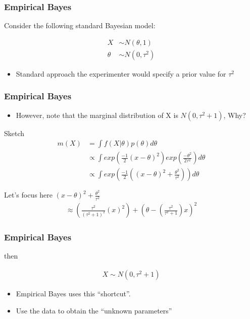 \documentclass[
  shownotes,
  xcolor={svgnames},
  hyperref={colorlinks,citecolor=DarkBlue,linkcolor=DarkRed,urlcolor=DarkBlue}
  , aspectratio=169]{beamer}
\begin{document}
\begin{frame}[fragile]
\frametitle{Empirical Bayes}

Consider the following standard Bayesian model:

\bigskip

\begin{align}
X &\sim N(\theta,1) \\
\theta &\sim N(0,\tau^2) 
\end{align}

\bigskip
\begin{itemize}
  \item Standard approach the experimenter would specify a prior value for $\tau^2$
\end{itemize}


\end{frame}
\begin{frame}[fragile]
\frametitle{Empirical Bayes}
\begin{itemize}
  \item However, note that the marginal distribution of X is $N(0,\tau^2+1)$, Why?
\end{itemize}
Sketch
\begin{align}
m(X) &=\int f(X|\theta)p(\theta)d\theta \\ \nonumber
 &\propto \int exp \left(\frac{-1}{2}(x-\theta)^2\right) exp \left( \frac{-\theta^2}{2\tau^2}\right) d\theta \\ \nonumber
 &\propto \int exp \left( \frac{-1}{2} \left( (x-\theta)^2 + \frac{\theta^2}{\tau^2}\right)\right) d\theta 
\end{align}

Let's focus here $(x-\theta)^{2}+\frac{\theta^{2}}{\tau^{2}} $
\begin{align}
\approx \left(\frac{\tau^2}{\left(\tau^{2}+1\right)^2}(x)^{2}\right)+\left(\theta-\left(\frac{\tau^{2}}{\tau^{2}+1}\right)x\right)^{2} 
\end{align}

\end{frame}
\begin{frame}[fragile]
\frametitle{Empirical Bayes}


then

\begin{align}
X \sim N(0,\tau^2+1)
\end{align}


\bigskip
\begin{itemize}
  \item Empirical Bayes uses this ``shortcut''.
  \item Use the data to obtain the ``unknown parameters''
\end{itemize}

\end{frame}
\end{document}
